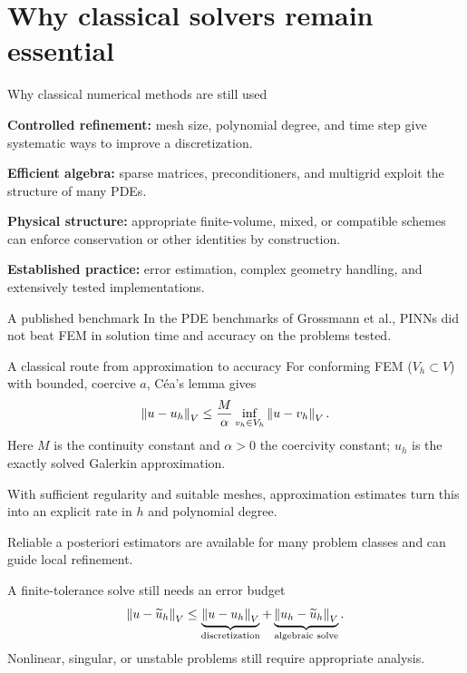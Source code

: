 \renewcommand{\slideid}{L3}
\section{Why classical solvers remain essential}

\renewcommand{\slideid}{L3-C01}
\begin{frame}[c]{Why classical numerical methods are still used}
\small
{}
\begin{slideitems}
\item \textbf{Controlled refinement:} mesh size, polynomial degree, and time step
give systematic ways to improve a discretization.
\item \textbf{Efficient algebra:} sparse matrices, preconditioners, and multigrid
exploit the structure of many PDEs.
\item \textbf{Physical structure:} appropriate finite-volume, mixed, or compatible
schemes can enforce conservation or other identities by construction.
\item \textbf{Established practice:} error estimation, complex geometry handling,
and extensively tested implementations.
\end{slideitems}
\begin{block}{A published benchmark}
In the PDE benchmarks of Grossmann et al., PINNs did not beat FEM in
solution time and accuracy on the problems tested.
\end{block}
\end{frame}

\renewcommand{\slideid}{L3-C02}
\begin{frame}[c]{A classical route from approximation to accuracy}
\small
For conforming FEM ($V_h\subset V$) with bounded, coercive $a$,
C\'ea's lemma gives
\[
 \left\lVert u-u_h\right\rVert_V\le \frac{M}{\alpha}
       \inf_{v_h\in V_h}\left\lVert u-v_h\right\rVert_V.
\]
Here $M$ is the continuity constant and $\alpha>0$ the coercivity constant;
$u_h$ is the exactly solved Galerkin approximation.
\begin{slideitems}
\item With sufficient regularity and suitable meshes, approximation estimates
turn this into an explicit rate in $h$ and polynomial degree.
\item Reliable a posteriori estimators are available for many problem classes
and can guide local refinement.
\end{slideitems}
\begin{block}{A finite-tolerance solve still needs an error budget}
\[
\left\lVert u-\widetilde u_h\right\rVert_V
\le \underbrace{\left\lVert u-u_h\right\rVert_V}_{\text{discretization}}
  + \underbrace{\left\lVert u_h-\widetilde u_h\right\rVert_V}_{\text{algebraic solve}}.
\]
Nonlinear, singular, or unstable problems still require appropriate analysis.
\end{block}
\end{frame}

